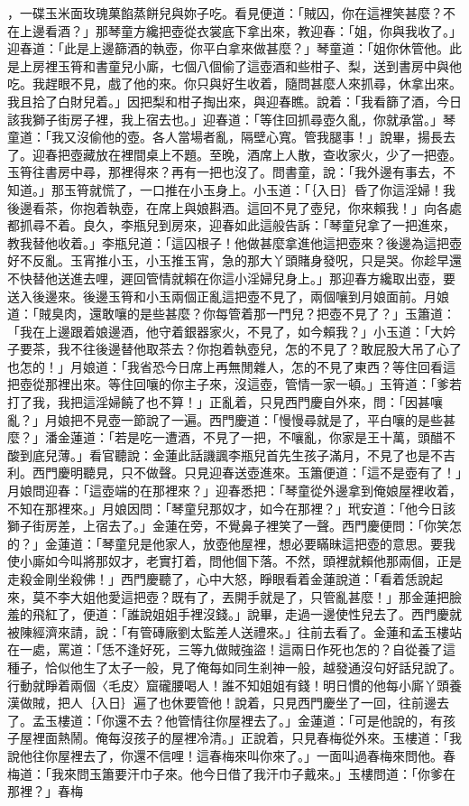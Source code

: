 \begin{showcontents}{}
，一碟玉米面玫瑰菓餡蒸餅兒與妳子吃。看見便道：「賊囚，你在這裡笑甚麼？不在上邊看酒？」那琴童方纔把壺從衣裳底下拿出來，教迎春：「姐，你與我收了。」迎春道：「此是上邊篩酒的執壺，你平白拿來做甚麼？」琴童道：「姐你休管他。此是上房裡玉筲和書童兒小廝，七個八個偷了這壺酒和些柑子、梨，送到書房中與他吃。我趕眼不見，戲了他的來。你只與好生收着，隨問甚麼人來抓尋，休拿出來。我且拾了白財兒着。」因把梨和柑子掏出來，與迎春瞧。說着：「我看篩了酒，今日該我獅子街房子裡，我上宿去也。」迎春道：「等住回抓尋壺久亂，你就承當。」琴童道：「我又沒偷他的壺。各人當場者亂，隔壁心寬。管我腿事！」說畢，揚長去了。迎春把壺藏放在裡間桌上不題。至晚，酒席上人散，查收家火，少了一把壺。玉筲往書房中尋，那裡得來？再有一把也沒了。問書童，說：「我外邊有事去，不知道。」那玉筲就慌了，一口推在小玉身上。小玉道：「｛入日｝昏了你這淫婦！我後邊看茶，你抱着執壺，在席上與娘斟酒。這回不見了壺兒，你來賴我！」向各處都抓尋不着。良久，李瓶兒到房來，迎春如此這般告訴：「琴童兒拿了一把進來，教我替他收着。」李瓶兒道：「這囚根子！他做甚麼拿進他這把壺來？後邊為這把壺好不反亂。玉宵推小玉，小玉推玉宵，急的那大丫頭賭身發呪，只是哭。你趁早還不快替他送進去哩，遲回管情就賴在你這小淫婦兒身上。」那迎春方纔取出壺，要送入後邊來。後邊玉筲和小玉兩個正亂這把壺不見了，兩個嚷到月娘面前。月娘道：「賊臭肉，還敢嚷的是些甚麼？你每管着那一門兒？把壺不見了？」玉簫道：「我在上邊跟着娘邊酒，他守着銀器家火，不見了，如今賴我？」小玉道：「大妗子要茶，我不往後邊替他取茶去？你抱着執壺兒，怎的不見了？敢屁股大吊了心了也怎的！」月娘道：「我省恐今日席上再無閒雜人，怎的不見了東西？等住回看這把壺從那裡出來。等住回嚷的你主子來，沒這壺，管情一家一頓。」玉筲道：「爹若打了我，我把這淫婦饒了也不算！」正亂着，只見西門慶自外來，問：「因甚嚷亂？」月娘把不見壺一節說了一遍。西門慶道：「慢慢尋就是了，平白嚷的是些甚麼？」潘金蓮道：「若是吃一遭酒，不見了一把，不嚷亂，你家是王十萬，頭醋不酸到底兒薄。」看官聽說：金蓮此話譏諷李瓶兒首先生孩子滿月，不見了也是不吉利。西門慶明聽見，只不做聲。只見迎春送壺進來。玉簫便道：「這不是壺有了！」月娘問迎春：「這壺端的在那裡來？」迎春悉把：「琴童從外邊拿到俺娘屋裡收着，不知在那裡來。」月娘因問：「琴童兒那奴才，如今在那裡？」玳安道：「他今日該獅子街房差，上宿去了。」金蓮在旁，不覺鼻子裡笑了一聲。西門慶便問：「你笑怎的？」金蓮道：「琴童兒是他家人，放壺他屋裡，想必要瞞昧這把壺的意思。要我使小廝如今叫將那奴才，老實打着，問他個下落。不然，頭裡就賴他那兩個，正是走殺金剛坐殺佛！」西門慶聽了，心中大怒，睜眼看着金蓮說道：「看着恁說起來，莫不李大姐他愛這把壺？既有了，丟開手就是了，只管亂甚麼！」那金蓮把臉羞的飛紅了，便道：「誰說姐姐手裡沒錢。」說畢，走過一邊使性兒去了。西門慶就被陳經濟來請，說：「有管磚廠劉太監差人送禮來。」往前去看了。金蓮和孟玉樓站在一處，罵道：「恁不逢好死，三等九做賊強盜！這兩日作死也怎的？自從養了這種子，恰似他生了太子一般，見了俺每如同生剎神一般，越發通沒句好話兒說了。行動就睜着兩個〈毛皮〉窟礲腰喝人！誰不知姐姐有錢！明日慣的他每小廝丫頭養漢做賊，把人｛入日｝遍了也休要管他！說着，只見西門慶坐了一回，往前邊去了。孟玉樓道：「你還不去？他管情往你屋裡去了。」金蓮道：「可是他說的，有孩子屋裡面熱鬧。俺每沒孩子的屋裡冷清。」正說着，只見春梅從外來。玉樓道：「我說他往你屋裡去了，你還不信哩！這春梅來叫你來了。」一面叫過春梅來問他。春梅道：「我來問玉簫要汗巾子來。他今日借了我汗巾子戴來。」玉樓問道：「你爹在那裡？」春梅
\end{showcontents}
